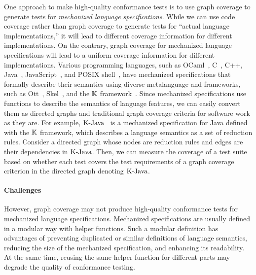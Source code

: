 
One approach to make high-quality conformance tests is to use graph coverage
to generate tests for \textit{mechanized language specifications}.
%
While we can use code coverage rather than graph coverage
to generate tests for ``actual language implementations,''
it will lead to different coverage information for different implementations.
On the contrary, graph coverage for mechanized language specifications
will lead to a uniform coverage information for different implementations.
%
Various programming languages, such as OCaml~\cite{ocaml-light-spec},
C~\cite{c-light-spec}, C++\cite{cpp-spec}, Java~\cite{k-java},
JavaScript~\cite{jiset}, and POSIX shell~\cite{posix-shell-spec},
have mechanized specifications that formally describe their
semantics using diverse metalanguage and frameworks, such as Ott~\cite{ott}, Skel~\cite{skel}, and the
$\mathbb{K}$ framework~\cite{kframework}.
%
Since mechanized specifications use functions to describe the semantics of language features,
we can easily convert them as directed graphs and traditional graph coverage
criteria for software work as they are.
For example, $\text{K-Java}$~\cite{k-java} is a mechanized specification for Java
defined with the $\mathbb{K}$ framework, which describes a language semantics
as a set of reduction rules.
Consider a directed graph whose nodes are reduction rules and edges are
their dependencies in $\text{K-Java}$.
Then, we can measure the coverage of a test suite based on whether each test
covers the test requirements of a graph coverage criterion in the directed graph
denoting $\text{K-Java}$.


\paragraph{\textbf{Challenges}}
However, graph coverage may not produce high-quality conformance tests
for mechanized language specifications.
Mechanized specifications are usually defined in a modular way with helper functions.
Such a modular definition has advantages of preventing duplicated or similar
definitions of language semantics, reducing the size of the mechanized
specification, and enhancing its readability.
At the same time, reusing the same helper function for different parts
may degrade the quality of conformance testing.


